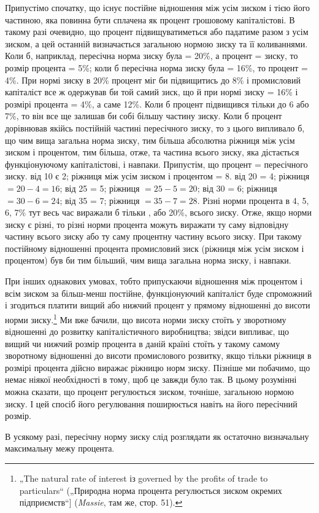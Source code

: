 Припустімо спочатку, що існує постійне відношення між усім
зиском і тією його частиною, яка повинна бути сплачена як процент
грошовому капіталістові. В такому разі очевидно, що процент
підвищуватиметься або падатиме разом з усім зиском, а цей
останній визначається загальною нормою зиску та її коливаннями.
Коли б, наприклад, пересічна норма зиску була = 20\%, а процент
=  зиску, то розмір процента = 5\%; коли б пересічна
норма зиску була = 16\%, то процент = 4\%. При нормі зиску в
20\% процент міг би підвищитись до 8\% і промисловий капіталіст
все ж одержував би той самий зиск, що й при нормі зиску
= 16\% і розмірі процента = 4\%, а саме 12\%. Коли б процент
підвищився тільки до 6 або 7\%, то він все ще залишав би собі
більшу частину зиску. Коли б процент дорівнював якійсь постійній
частині пересічного зиску, то з цього випливало б, що
чим вища загальна норма зиску, тим більша абсолютна ріжниця
між усім зиском і процентом, тим більша, отже, та частина
всього зиску, яка дістається функціонуючому капіталістові, і навпаки.
Припустім, що процент =  пересічного зиску.  від 10
є 2; ріжниця між усім зиском і процентом = 8.  від 20 = 4;
ріжниця $= 20 - 4 = 16$;  від 25 = 5; ріжниця $= 25 - 5 = 20$;  від
30 = 6; ріжниця $= 30 - 6 = 24$;  від 35 = 7; ріжниця $= 35 - 7 = 28$.
Різні норми процента в 4, 5, 6, 7\% тут весь час виражали б
тільки , або 20\%, всього зиску. Отже, якщо норми зиску є різні,
то різні норми процента можуть виражати ту саму відповідну
частину всього зиску або ту саму процентну частину всього
зиску. При такому постійному відношенні процента промисловий
зиск (ріжниця між усім зиском і процентом) був би тим більший,
чим вища загальна норма зиску, і навпаки.

При інших однакових умовах, тобто припускаючи відношення
між процентом і всім зиском за більш-менш постійне, функціонуючий
капіталіст буде спроможний і згодиться платити вищий
або нижчий процент у прямому відношенні до висоти норми
зиску.\footnote{
„The natural rate of interest із governed by the profits of trade to particulars“
(„Природна норма процента регулюється зиском окремих підприємств“]
(\emph{Massie}, там же, стор. 51).
} Ми вже бачили, що висота норми зиску стоїть у зворотному
відношенні до розвитку капіталістичного виробництва;
звідси випливає, що вищий чи нижчий розмір процента в даній
країні стоїть у такому самому зворотному відношенні до висоти
промислового розвитку, якщо тільки ріжниця в розмірі
процента дійсно виражає ріжницю норм зиску. Пізніше ми побачимо,
що немає ніякої необхідності в тому, щоб це завжди
було так. В цьому розумінні можна сказати, що процент регулюється
зиском, точніше, загальною нормою зиску. І цей спосіб
його регулювання поширюється навіть на його пересічний розмір.

В усякому разі, пересічну норму зиску слід розглядати як
остаточно визначальну максимальну межу процента.
